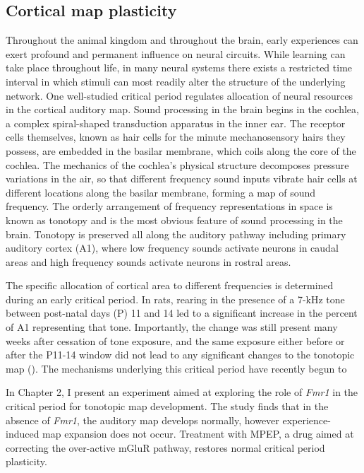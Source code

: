 \subsection{Cortical map plasticity}

Throughout the animal kingdom and throughout the brain, early experiences can exert profound and permanent influence on neural circuits. While learning can take place throughout life, in many neural systems there exists a restricted time interval in which stimuli can most readily alter the structure of the underlying network. One well-studied critical period regulates allocation of neural resources in the cortical auditory map. Sound processing in the brain begins in the cochlea, a complex spiral-shaped transduction apparatus in the inner ear. The receptor cells themselves, known as hair cells for the minute mechanosensory hairs they possess, are embedded in the basilar membrane, which coils along the core of the cochlea. The mechanics of the cochlea's physical structure decomposes pressure variations in the air, so that different frequency sound inputs vibrate hair cells at different locations along the basilar membrane, forming a map of sound frequency. The orderly arrangement of frequency representations in space is known as tonotopy and is the most obvious feature of sound processing in the brain. Tonotopy is preserved all along the auditory pathway including primary auditory cortex (A1), where low frequency sounds activate neurons in caudal areas and high frequency sounds activate neurons in rostral areas.

The specific allocation of cortical area to different frequencies is determined during an early critical period. In rats, rearing in the presence of a 7-kHz tone between post-natal days (P) 11 and 14 led to a significant increase in the percent of A1 representing that tone. Importantly, the change was still present many weeks after cessation of tone exposure, and the same exposure either before or after the P11-14 window did not lead to any significant changes to the tonotopic map (\cite{DeVillers-Sidani2007}). The mechanisms underlying this critical period have recently begun to 

In Chapter 2, I present an experiment aimed at exploring the role of \textit{Fmr1} in the critical period for tonotopic map development. The study finds that in the absence of \textit{Fmr1}, the auditory map develops normally, however experience-induced map expansion does not occur. Treatment with MPEP, a drug aimed at correcting the over-active mGluR pathway, restores normal critical period plasticity.

